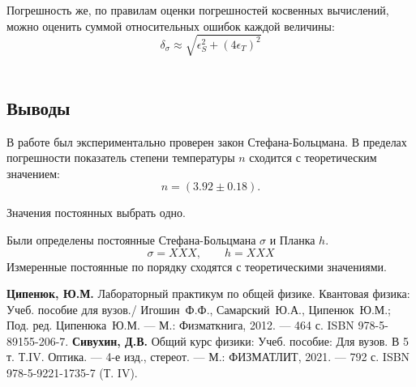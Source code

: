 \documentclass[10pt,a4paper]{article}
\begin{document}
\begin{multicols}{2}
	Погрешность же, по правилам оценки погрешностей косвенных вычислений, можно оценить суммой относительных ошибок каждой величины:
	$$\delta_\sigma \approx \sqrt{\epsilon_S^2 + (4\epsilon_T)^2}$$\\

	\subsection*{Выводы}
	
	В работе был экспериментально проверен закон Стефана-Больцмана. В пределах погрешности показатель степени температуры $n$ сходится с теоретическим значением:
	$$
	n = (3.92 \pm 0.18).
	$$
	
	\Huge 
	\color{red}
	Значения постоянных выбрать одно.
	\color{black}
	\normalsize	
	
	Были определены постоянные Стефана-Больцмана $\sigma$ и Планка $h$. 
	$$
	\sigma = XXX, \qquad h = XXX
	$$
	Измеренные постоянные по порядку сходятся с теоретическими значениями.
	
	\begin{thebibliography}{}
		 \textbf{Ципенюк, Ю.М.} Лабораторный практикум по общей физике. Квантовая физика: Учеб. пособие для вузов./ Игошин~Ф.Ф., Самарский~Ю.А., Ципенюк~Ю.М.; Под. ред. Ципенюка~Ю.М. --- М.: Физматкнига, 2012. --- 464 с. ISBN 978-5-89155-206-7.
		 \textbf{Сивухин, Д.В.} Общий курс физики: Учеб. пособие: Для вузов. В 5 т. Т.IV. Оптика. --- 4-е изд., стереот. --- М.: ФИЗМАТЛИТ, 2021. --- 792 с. ISBN 978-5-9221-1735-7 (Т. IV).
	\end{thebibliography}
\end{multicols}
\end{document}
